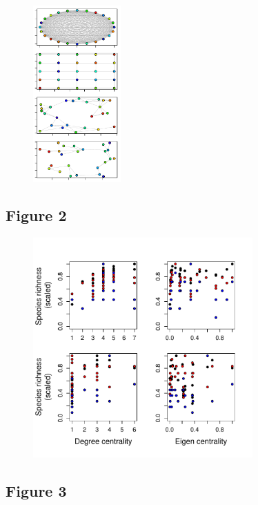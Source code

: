\documentclass[12pt]{article}
\begin{document}
\begin{figure}[ht!]
	\centering\includegraphics[width=0.3\textwidth]{Networks.pdf}
\end{figure}

\newpage

\subsection*{Figure 2}

\begin{figure}[ht!]
	\centering\includegraphics[width=0.75\textwidth]{Centrality.pdf}
\end{figure}

\newpage

\subsection*{Figure 3}
\end{document}

